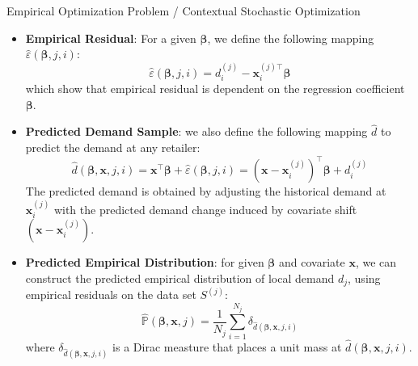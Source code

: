 \documentclass{beamer}
\newcommand{\txrd}[1]{{\textcolor{sintefred}{\textbf{#1}}}}
\newcommand{\bbp}{\mathbb{P}}
\begin{document}
\begin{frame}{Empirical Optimization Problem / Contextual Stochastic Optimization}

\begin{itemize}
    \item \txrd{Empirical Residual}: For a given ${\bm \beta}$, we define the following mapping $\hat{\varepsilon}({\bm \beta}, j, i)$:
    \[
    \hat{\varepsilon}({\bm \beta}, j, i)  = {d}_i^{(j)} - {\bm x}_i^{(j) \top} {\bm \beta}
    \]
    which show that empirical residual is dependent on the regression coefficient ${\bm \beta}$.
    \item \txrd{Predicted Demand Sample}: we also define the following mapping $\hat{d}$ to predict the demand at any retailer:
    \[
    \hat{d}({\bm \beta}, {\bm x}, j, i) = \bm x ^\top \bm \beta + \hat{\varepsilon}({\bm \beta}, j, i) = (\bm x - {\bm x}_i^{(j)})^ \top {\bm \beta} + {d}_i^{(j)}
    \]
    The predicted demand is obtained by adjusting the historical demand at ${\bm x}_i^{(j)}$ with the predicted demand change induced by covariate shift $(\bm x - {\bm x}_i^{(j)})$.
    \item \txrd{Predicted Empirical Distribution}: for given ${\bm \beta}$ and covariate ${\bm x}$, we can construct the predicted empirical distribution of local demand $d_j$, using empirical residuals on the data set $S^{(j)}$:
    \[
    \hat{\bbp}(\bm \beta,\bm x, j) = \frac{1}{N_j} \sum_{i=1}^{N_j} \delta_{\hat{d}({\bm \beta}, {\bm x}, j, i)}
    \]
    where $\delta_{\hat{d}({\bm \beta}, {\bm x}, j, i)}$ is a Dirac measture that places a unit mass at ${\hat{d}({\bm \beta}, {\bm x}, j, i)}$.
\end{itemize}
\end{frame}
\end{document}
